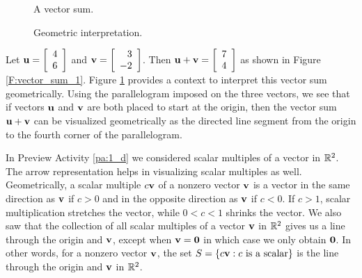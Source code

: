 \begin{figure}[ht]
\begin{center}
\begin{minipage}{1.75in}
\begin{center}
\resizebox{!}{1.5in}{\texttt{[image: 1\_d\_a\_3]}}
\end{center}
\caption{A vector sum.}
\label{F:vector_sum_1}
\end{minipage} \hspace{0.5in}
\begin{minipage}{1.75in}
\begin{center}
\resizebox{!}{1.5in}{\texttt{[image: 1\_d\_a\_4]}}
\end{center}
\caption{Geometric interpretation.}
\label{F:vector_sum_2}
\end{minipage} 
\end{center}
\end{figure}

Let $\mathbf{u} = \left[ \begin{array}{c} 4\\ 6\end{array} \right] $ and $\mathbf{v} = \left[ \begin{array}{r} 3\\ -2\end{array} \right] $. Then $\mathbf{u} + \mathbf{v} = \left[ \begin{array}{c} 7\\ 4\end{array} \right] $ as shown in Figure \ref{F:vector_sum_1}. Figure \ref{F:vector_sum_2} provides a context to interpret this vector sum geometrically. Using the parallelogram imposed on the three vectors, we see that if vectors $\mathbf{u}$ and $\mathbf{v}$ are both placed to start at the origin, then the vector sum $\mathbf{u} + \mathbf{v}$ can be visualized geometrically as the directed line segment from the origin to the fourth corner of the parallelogram.


In Preview Activity \ref{pa:1_d} we considered scalar multiples of a vector in $\mathbb{R}^2$. The arrow representation helps in visualizing scalar multiples as well. Geometrically, a scalar multiple $c\mathbf{v}$ of a nonzero vector $\mathbf{v}$ is a vector in the same direction as $\mathbf{v}$ if $c>0$ and in the opposite direction as $\mathbf{v}$ if $c<0$. If $c>1$, scalar multiplication stretches the vector, while $0<c<1$ shrinks the vector. We also saw that the collection of all scalar multiples of a vector $\mathbf{v}$ in $\mathbb{R}^2$ gives us a line through the origin and $\mathbf{v}$, except when $\mathbf{v}=\mathbf{0}$ in which case we only obtain $\mathbf{0}$. In other words, for a nonzero vector $\mathbf{v}$, the set $S = \{c\mathbf{v} : c \text{ is a scalar}\}$ is the line through the origin and $\mathbf{v}$ in $\mathbb{R}^2$. 

